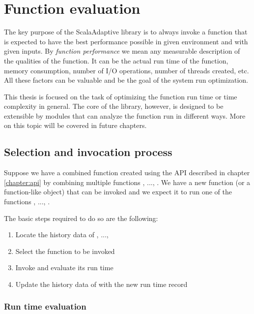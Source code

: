 \chapter{Function evaluation}

The key purpose of the ScalaAdaptive library is to always invoke a function that is expected to have the best performance possible in given environment and with given inputs. By \textit{function performance} we mean any measurable description of the qualities of the function. It can be the actual run time of the function, memory consumption, number of I/O operations, number of threads created, etc. All these factors can be valuable and be the goal of the system run optimization.

This thesis is focused on the task of optimizing the function run time or time complexity in general. The core of the library, however, is designed to be extensible by modules that can analyze the function run in different ways. More on this topic will be covered in future chapters. %

\section{Selection and invocation process}
\label{sec:selection_and_invocation_process}

Suppose we have a combined function  created using the API described in chapter \ref{chapter:api} by combining multiple functions , ..., . We have a new function (or a function-like object) that can be invoked and we expect it to run one of the functions , ..., .

The basic steps required to do so are the following:

\begin{enumerate}
	\item Locate the history data of , ..., 
	\item Select the function  to be invoked
	\item Invoke  and evaluate its run time
	\item Update the history data of  with the new run time record
\end{enumerate}

\subsection{Run time evaluation}

